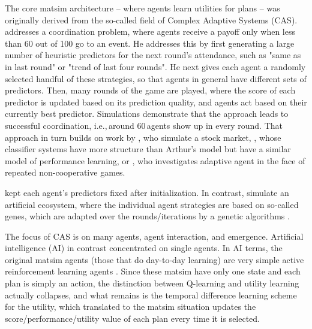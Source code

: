







The core \gls{matsim} architecture -- where agents learn utilities for plans -- was originally derived from the so-called field of Complex Adaptive Systems (CAS).  
%
\cite{ArthurBar} addresses a coordination problem, where agents receive a payoff only when less than 60 out of 100 go to an event.  He addresses this by first generating a large number of heuristic predictors for the next round's attendance, such as "same as in last round" or "trend of last four rounds".  He next gives each agent a randomly selected handful of these strategies, so that agents in general have different sets of predictors.  Then, many rounds of the game are played, where the score of each predictor is updated based on its prediction quality, and agents act based on their currently best predictor.  Simulations demonstrate that the approach leads to successful coordination, i.e.,\,around 60\,agents show up in every round.
%
That approach in turn builds on work by \cite{PalmerEtAl_PhysicaD_1994}, who simulate a stock market,  \cite{Holland_1992}, whose classifier systems have more structure than Arthur's model but have a similar model of performance learning, or \cite{AxelrodBook}, who investigates adaptive agent in the face of repeated non-cooperative games.  

\citet{ArthurBar} kept each agent's predictors fixed after initialization.  In contrast,
\cite{HraberJonesForrestEcho} simulate an artificial ecosystem, where the individual agent strategies are based on so-called genes, which are adapted over the rounds/iterations by a genetic algorithms \citep{Goldberg_1989}.

The focus of CAS is on many agents, agent interaction, and emergence. Artificial intelligence (AI) in contrast concentrated on single agents. In AI terms, the original \gls{matsim} agents (those that do day-to-day learning) are very simple active reinforcement learning agents \citep[][Chapter 21.3]{RusselNorvig2010ArtificialIntelligence}. Since these \gls{matsim} have only one state and each plan is simply an action, the distinction between Q-learning and utility learning actually collapses, and what remains is the temporal difference learning scheme for the utility, which translated to the \gls{matsim} situation updates the score/performance/utility value of each plan every time it is selected.

